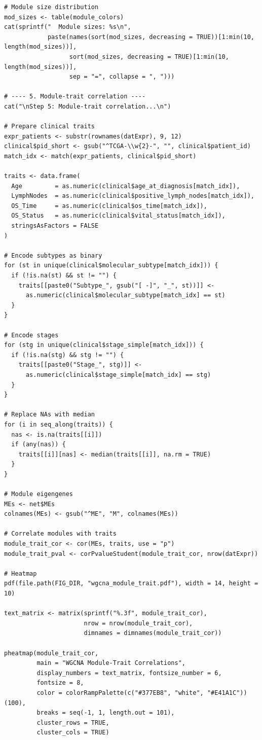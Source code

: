 \documentclass[12pt,a4paper]{ctexart}
\begin{document}
\begin{lstlisting}[caption={08_wgcna}, basicstyle=\ttfamily\scriptsize]
# Module size distribution
mod_sizes <- table(module_colors)
cat(sprintf("  Module sizes: %s\n",
            paste(names(sort(mod_sizes, decreasing = TRUE))[1:min(10, length(mod_sizes))],
                  sort(mod_sizes, decreasing = TRUE)[1:min(10, length(mod_sizes))],
                  sep = "=", collapse = ", ")))

# ---- 5. Module-trait correlation ----
cat("\nStep 5: Module-trait correlation...\n")

# Prepare clinical traits
expr_patients <- substr(rownames(datExpr), 9, 12)
clinical$pid_short <- gsub("^TCGA-\\w{2}-", "", clinical$patient_id)
match_idx <- match(expr_patients, clinical$pid_short)

traits <- data.frame(
  Age         = as.numeric(clinical$age_at_diagnosis[match_idx]),
  LymphNodes  = as.numeric(clinical$positive_lymph_nodes[match_idx]),
  OS_Time     = as.numeric(clinical$os_time[match_idx]),
  OS_Status   = as.numeric(clinical$vital_status[match_idx]),
  stringsAsFactors = FALSE
)

# Encode subtypes as binary
for (st in unique(clinical$molecular_subtype[match_idx])) {
  if (!is.na(st) && st != "") {
    traits[[paste0("Subtype_", gsub("[ -]", "_", st))]] <-
      as.numeric(clinical$molecular_subtype[match_idx] == st)
  }
}

# Encode stages
for (stg in unique(clinical$stage_simple[match_idx])) {
  if (!is.na(stg) && stg != "") {
    traits[[paste0("Stage_", stg)]] <-
      as.numeric(clinical$stage_simple[match_idx] == stg)
  }
}

# Replace NAs with median
for (i in seq_along(traits)) {
  nas <- is.na(traits[[i]])
  if (any(nas)) {
    traits[[i]][nas] <- median(traits[[i]], na.rm = TRUE)
  }
}

# Module eigengenes
MEs <- net$MEs
colnames(MEs) <- gsub("^ME", "M", colnames(MEs))

# Correlate modules with traits
module_trait_cor <- cor(MEs, traits, use = "p")
module_trait_pval <- corPvalueStudent(module_trait_cor, nrow(datExpr))

# Heatmap
pdf(file.path(FIG_DIR, "wgcna_module_trait.pdf"), width = 14, height = 10)

text_matrix <- matrix(sprintf("%.3f", module_trait_cor),
                      nrow = nrow(module_trait_cor),
                      dimnames = dimnames(module_trait_cor))

pheatmap(module_trait_cor,
         main = "WGCNA Module-Trait Correlations",
         display_numbers = text_matrix, fontsize_number = 6,
         fontsize = 8,
         color = colorRampPalette(c("#377EB8", "white", "#E41A1C"))(100),
         breaks = seq(-1, 1, length.out = 101),
         cluster_rows = TRUE,
         cluster_cols = TRUE)


\end{lstlisting}
\end{document}
